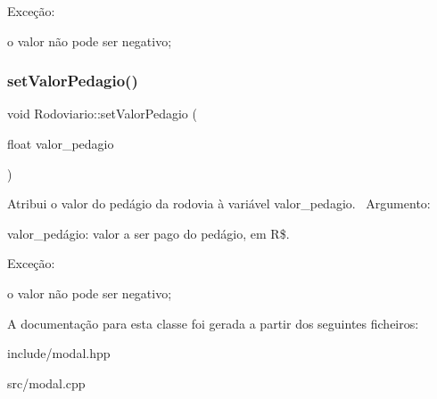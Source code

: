 Exceção\+:
\begin{DoxyItemize}
\item o valor não pode ser negativo;
\end{DoxyItemize}\mbox{\label{classRodoviario_a920f911349153ac9e95df101fe1afe0c}} 
\subsubsection{\texorpdfstring{set\+Valor\+Pedagio()}{setValorPedagio()}}
{\footnotesize\ttfamily void Rodoviario\+::set\+Valor\+Pedagio (\begin{DoxyParamCaption}\item[{float}]{valor\+\_\+pedagio }\end{DoxyParamCaption})}

Atribui o valor do pedágio da rodovia à variável valor\+\_\+pedagio.~\newline
 Argumento\+:
\begin{DoxyItemize}
\item valor\+\_\+pedágio\+: valor a ser pago do pedágio, em R\$.~\newline

\end{DoxyItemize}

Exceção\+:
\begin{DoxyItemize}
\item o valor não pode ser negativo;
\end{DoxyItemize}

A documentação para esta classe foi gerada a partir dos seguintes ficheiros\+:\begin{DoxyCompactItemize}
\item 
include/modal.\+hpp\item 
src/modal.\+cpp\end{DoxyCompactItemize}
